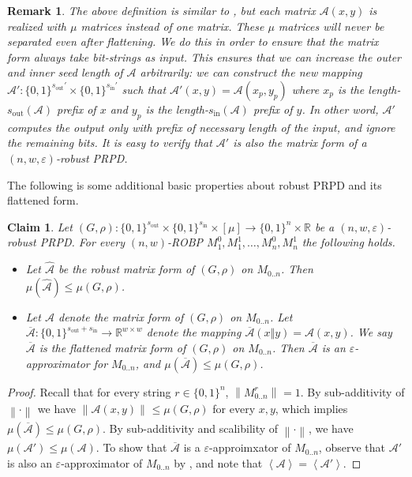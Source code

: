 \documentclass[10pt,a4paper]{article}
\newtheorem{claim}[theorem]{Claim}
\newtheorem{remark}[theorem]{Remark}
\newcommand{\inp}[1]{\left\langle#1\right\rangle}
\newcommand{\norm}[2][]{\left\|#2\right\|_{#1}}
\newcommand{\bbR}{\mathbb R}
\newcommand{\cA}{\mathcal A}
\newcommand{\bits}[1]{\{0,1\}^{#1}}
\newcommand{\eps}{\varepsilon}
\newcommand{\wt}{\mu}
\newcommand{\sout}[1][]{s_{\mathrm{out}#1}}
\newcommand{\si}[1][]{s_{\mathrm{in}#1}}
\begin{document}
\begin{remark}\label{rmk:mon}
The above definition is similar to , but each matrix $\cA(x,y)$ is realized with $\wt$ matrices instead of one matrix. These $\wt$ matrices will never be separated even after flattening. We do this in order to ensure that the matrix form always take bit-strings as input. This ensures that we can increase the outer and inner seed length of $\cA$ arbitrarily: we can construct the new mapping $\cA':\bits{\sout'}\times\bits{\si'}$ such that $\cA'(x,y)=\cA(x_p,y_p)$ where $x_p$ is the length-$\sout(\cA)$ prefix of $x$ and $y_p$ is the length-$\si(\cA)$ prefix of $y$. In other word, $\cA'$ computes the output only with prefix of necessary length of the input, and ignore the remaining bits. It is easy to verify that $\cA'$ is also the matrix form of a $(n,w,\eps)$-robust PRPD.
\end{remark}
\noindent
The following is some additional basic properties about robust PRPD and its flattened form.
\begin{claim}\label{claim:std-approx}
Let $(G,\rho):\bits{\sout}\times\bits{\si}\times{[\wt]}\to\bits{n}\times\bbR$ be a $(n,w,\eps)$-\emph{robust PRPD}. For every $(n,w)$-ROBP $M_1^0,M_1^1,\dots,M_n^0,M_n^1$ the following holds.
\begin{itemize}
\item 
Let $\widehat{\cA}$ be the robust matrix form of $(G,\rho)$ on $M_{0..n}$. Then $\wt(\widehat{\cA})\le \wt(G,\rho)$.
\item
Let $\cA$ denote the matrix form of $(G,\rho)$ on $M_{0..n}$. Let $\overline{\cA}:\bits{\sout+\si}\to\bbR^{w\times w}$ denote the mapping $\overline{\cA}(x\Vert y)=\cA(x,y)$. We say $\overline{\cA}$ is the \emph{flattened matrix form} of $(G,\rho)$ on $M_{0..n}$. Then $\overline{\cA}$ is an $\eps$-approximator for $M_{0..n}$, and $\wt(\overline{\cA})\le\wt(G,\rho)$.
\end{itemize}
\end{claim}
\begin{proof}
Recall that for every string $r\in\bits{n}$, $\norm{M_{0..n}^r}=1$. By sub-additivity of $\norm{\cdot}$ we have $\norm{\cA(x,y)}\le\wt(G,\rho)$ for every $x,y$, which implies $\wt(\overline{\cA})\le\wt(G,\rho)$. By sub-additivity and scalibility of $\norm{\cdot}$, we have $\wt(\cA')\le \wt(\cA)$. To show that $\overline{\cA}$ is a $\eps$-approimxator of $M_{0..n}$, observe that $\cA'$ is also an $\eps$-approximator of $M_{0..n}$ by , and note that $\inp{\cA}=\inp{\cA'}$.
\end{proof}
\end{document}
